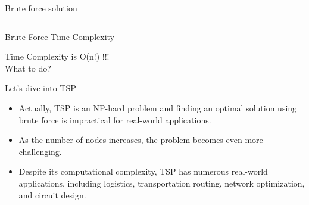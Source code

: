 \documentclass[12pt]{beamer}
\begin{document}
\begin{frame}{Brute force solution}
    \begin{columns}
            
           \newline
    \end{columns}
    
\end{frame}

\begin{frame}{Brute Force Time Complexity}
    \begin{alertblock}{}
        Time Complexity is O(n!) !!! \\
        What to do?
    \end{alertblock}
\end{frame}



\begin{frame}{Let's dive into TSP}
  \begin{itemize}
    \item<1-3> Actually, TSP is an NP-hard problem and finding an optimal solution using brute force is impractical for real-world applications.
    \item<2-3>  As the number of nodes increases, the problem becomes even more challenging.
    \item<3> Despite its computational complexity, TSP has numerous real-world applications, including logistics, transportation routing, network optimization, and circuit design.    
  \end{itemize}
  
\end{frame}
\end{document}
